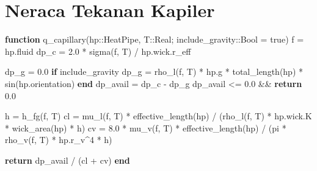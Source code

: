 \documentclass[
  indonesian,
  12pt,
  a4paper,
]{report}
\newenvironment{Shaded}{\begin{snugshade}}{\end{snugshade}}
\newcommand{\ConstantTok}[1]{\textcolor[rgb]{0.56,0.35,0.01}{#1}}
\newcommand{\ControlFlowTok}[1]{\textcolor[rgb]{0.00,0.23,0.31}{\textbf{#1}}}
\newcommand{\DataTypeTok}[1]{\textcolor[rgb]{0.68,0.00,0.00}{#1}}
\newcommand{\FloatTok}[1]{\textcolor[rgb]{0.68,0.00,0.00}{#1}}
\newcommand{\FunctionTok}[1]{\textcolor[rgb]{0.28,0.35,0.67}{#1}}
\newcommand{\KeywordTok}[1]{\textcolor[rgb]{0.00,0.23,0.31}{\textbf{#1}}}
\newcommand{\NormalTok}[1]{\textcolor[rgb]{0.00,0.23,0.31}{#1}}
\newcommand{\OperatorTok}[1]{\textcolor[rgb]{0.37,0.37,0.37}{#1}}
\begin{document}
\section{Neraca Tekanan Kapiler}\label{neraca-tekanan-kapiler}

\begin{Shaded}
\begin{Highlighting}[]
\KeywordTok{function} \FunctionTok{q\_capillary}\NormalTok{(hp}\OperatorTok{::}\DataTypeTok{HeatPipe}\NormalTok{, T}\OperatorTok{::}\DataTypeTok{Real}\NormalTok{; include\_gravity}\OperatorTok{::}\DataTypeTok{Bool }\OperatorTok{=} \ConstantTok{true}\NormalTok{)}
\NormalTok{    f }\OperatorTok{=}\NormalTok{ hp.fluid}
\NormalTok{    dp\_c }\OperatorTok{=} \FloatTok{2.0} \OperatorTok{*} \FunctionTok{sigma}\NormalTok{(f, T) }\OperatorTok{/}\NormalTok{ hp.wick.r\_eff}

\NormalTok{    dp\_g }\OperatorTok{=} \FloatTok{0.0}
    \ControlFlowTok{if}\NormalTok{ include\_gravity}
\NormalTok{        dp\_g }\OperatorTok{=} \FunctionTok{rho\_l}\NormalTok{(f, T) }\OperatorTok{*}\NormalTok{ hp.g }\OperatorTok{*} \FunctionTok{total\_length}\NormalTok{(hp) }\OperatorTok{*} \FunctionTok{sin}\NormalTok{(hp.orientation)}
    \ControlFlowTok{end}
\NormalTok{    dp\_avail }\OperatorTok{=}\NormalTok{ dp\_c }\OperatorTok{{-}}\NormalTok{ dp\_g}
\NormalTok{    dp\_avail }\OperatorTok{\textless{}=} \FloatTok{0.0} \OperatorTok{\&\&} \ControlFlowTok{return} \FloatTok{0.0}

\NormalTok{    h }\OperatorTok{=} \FunctionTok{h\_fg}\NormalTok{(f, T)}
\NormalTok{    cl }\OperatorTok{=} \FunctionTok{mu\_l}\NormalTok{(f, T) }\OperatorTok{*} \FunctionTok{effective\_length}\NormalTok{(hp) }\OperatorTok{/}
\NormalTok{         (}\FunctionTok{rho\_l}\NormalTok{(f, T) }\OperatorTok{*}\NormalTok{ hp.wick.K }\OperatorTok{*} \FunctionTok{wick\_area}\NormalTok{(hp) }\OperatorTok{*}\NormalTok{ h)}
\NormalTok{    cv }\OperatorTok{=} \FloatTok{8.0} \OperatorTok{*} \FunctionTok{mu\_v}\NormalTok{(f, T) }\OperatorTok{*} \FunctionTok{effective\_length}\NormalTok{(hp) }\OperatorTok{/}
\NormalTok{         (}\ConstantTok{pi} \OperatorTok{*} \FunctionTok{rho\_v}\NormalTok{(f, T) }\OperatorTok{*}\NormalTok{ hp.r\_v}\OperatorTok{\^{}}\FloatTok{4} \OperatorTok{*}\NormalTok{ h)}

    \ControlFlowTok{return}\NormalTok{ dp\_avail }\OperatorTok{/}\NormalTok{ (cl }\OperatorTok{+}\NormalTok{ cv)}
\KeywordTok{end}
\end{Highlighting}
\end{Shaded}
\end{document}
